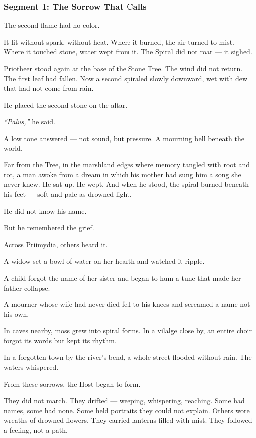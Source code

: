 \documentclass[9pt]{article}
\begin{document}
\newpage

\subsubsection*{Segment 1: The Sorrow That Calls}

The second flame had no color.

It lit without spark, without heat. Where it burned, the air turned to mist. Where it touched stone, water wept from it. The Spiral did not roar — it sighed.

Priotheer stood again at the base of the Stone Tree. The wind did not return. The first leaf had fallen. Now a second spiraled slowly downward, wet with dew that had not come from rain.

He placed the second stone on the altar.

\textit{``Palus,''} he said.

A low tone answered — not sound, but pressure. A mourning bell beneath the world.

Far from the Tree, in the marshland edges where memory tangled with root and rot, a man awoke from a dream in which his mother had sung him a song she never knew. He sat up. He wept. And when he stood, the spiral burned beneath his feet — soft and pale as drowned light.

He did not know his name.

But he remembered the grief.

Across Priimydia, others heard it.

A widow set a bowl of water on her hearth and watched it ripple.

A child forgot the name of her sister and began to hum a tune that made her father collapse.

A mourner whose wife had never died fell to his knees and screamed a name not his own.

In caves nearby, moss grew into spiral forms. In a vilalge close by, an entire choir forgot its words but kept its rhythm.

In a forgotten town by the river’s bend, a whole street flooded without rain. The waters whispered.

From these sorrows, the Host began to form.

They did not march. They drifted — weeping, whispering, reaching. Some had names, some had none. Some held portraits they could not explain. Others wore wreaths of drowned flowers. They carried lanterns filled with mist. They followed a feeling, not a path.
\end{document}
